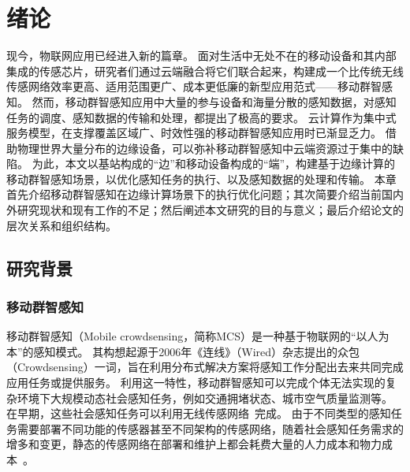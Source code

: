 

\chapter{绪论}


现今，物联网应用已经进入新的篇章。
面对生活中无处不在的移动设备和其内部集成的传感芯片，研究者们通过云端融合将它们联合起来，构建成一个比传统无线传感网络效率更高、适用范围更广、成本更低廉的新型应用范式——移动群智感知。
然而，移动群智感知应用中大量的参与设备和海量分散的感知数据，对感知任务的调度、感知数据的传输和处理，都提出了极高的要求。
云计算作为集中式服务模型，在支撑覆盖区域广、时效性强的移动群智感知应用时已渐显乏力。
借助物理世界大量分布的边缘设备，可以弥补移动群智感知中云端资源过于集中的缺陷。
为此，本文以基站构成的“边”和移动设备构成的“端”，构建基于边缘计算的移动群智感知场景，以优化感知任务的执行、以及感知数据的处理和传输。
本章首先介绍移动群智感知在边缘计算场景下的执行优化问题；其次简要介绍当前国内外研究现状和现有工作的不足；然后阐述本文研究的目的与意义；最后介绍论文的层次关系和组织结构。

\section{研究背景}

\subsection{移动群智感知}


移动群智感知（Mobile crowdsensing，简称MCS）是一种基于物联网的“以人为本”的感知模式。
其构想起源于2006年《连线》（Wired）杂志提出的众包（Crowdsensing）一词，旨在利用分布式解决方案将感知工作分配出去来共同完成应用任务或提供服务。
利用这一特性，移动群智感知可以完成个体无法实现的复杂环境下大规模动态社会感知任务，例如交通拥堵状态、城市空气质量监测等。
在早期，这些社会感知任务可以利用无线传感网络~\cite{DBLP:journals/cn/AkyildizSSC02}完成。
由于不同类型的感知任务需要部署不同功能的传感器甚至不同架构的传感网络，随着社会感知任务需求的增多和变更，静态的传感网络在部署和维护上都会耗费大量的人力成本和物力成本~\cite{CNKI/2006/WSNRen}。

